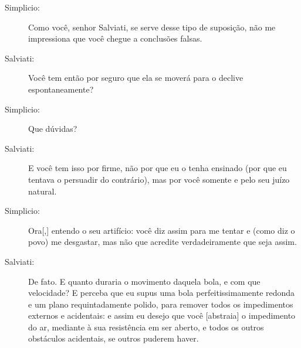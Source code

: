 \begin{description}
\item[Simplicio:] Como você, senhor Salviati, se serve desse tipo de suposição, não me impressiona que você chegue a conclusões falsas.

\item[Salviati:] Você tem então por seguro que ela se moverá para o declive espontaneamente?

\item[Simplicio:] Que dúvidas?

\item[Salviati:] E você tem isso por firme, não por que eu o tenha ensinado (por que eu tentava o persuadir do contrário), mas por você somente e pelo seu juízo natural.

\item[Simplicio:] Ora[,] entendo o seu artifício: você diz assim para me tentar e (como diz o povo) me desgastar, mas não que acredite verdadeiramente que seja assim. 

\item[Salviati:] De fato. E quanto duraria o movimento daquela bola, e com que velocidade? E perceba que eu supus uma bola perfeitissimamente redonda e um plano requintadamente polido, para remover todos os impedimentos externos e acidentais: e assim eu desejo que você [abstraia] o impedimento do ar, mediante à sua resistência em ser aberto, e todos os outros obstáculos acidentais, se outros puderem haver.


\end{description}
